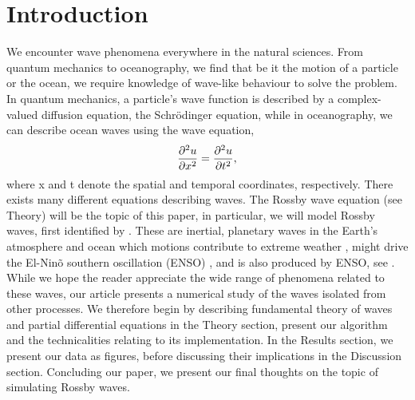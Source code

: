 \section{Introduction}
\label{sec:introduction}

We encounter wave phenomena everywhere in the natural sciences. From quantum mechanics to oceanography, we find that be it the motion of a particle or the ocean, we require knowledge of wave-like behaviour to solve the problem. In quantum mechanics, a particle's wave function is described by a complex-valued diffusion equation, the Schrödinger equation, while in oceanography, we can describe ocean waves using the wave equation,
	\begin{equation}
	\label{eq:wave}
	\pdv[2]{u}{x} = \pdv[2]{u}{t},
	\end{equation}
where x and t denote the spatial and temporal coordinates, respectively. There exists many different equations describing waves. The Rossby wave equation (see Theory) will be the topic of this paper, in particular, we will model Rossby waves, first identified by \citet{rossby}. These are inertial, planetary waves in the Earth's atmosphere and ocean which motions contribute to extreme weather \citep{mann2017influence}, might drive the El-Ninõ southern oscillation (ENSO) \citep{bosc2008observed}, and is also produced by ENSO, see \citet{battisti1989role}. While we hope the reader appreciate the wide range of phenomena related to these waves, our article presents a numerical study of the waves isolated from other processes. We therefore begin by describing fundamental theory of waves and partial differential equations in the Theory section, present our algorithm and the technicalities relating to its implementation. In the Results section, we present our data as figures, before discussing their implications in the Discussion section. Concluding our paper, we present our final thoughts on the topic of simulating Rossby waves.